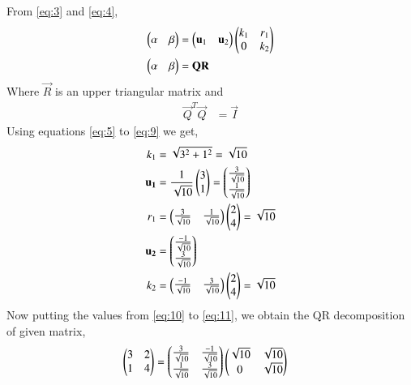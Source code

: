 \documentclass[journal,12pt,twocolumn]{IEEEtran}
\begin{document}
From \eqref{eq:3} and \eqref{eq:4}, 
\begin{align}
\begin{pmatrix}\alpha & \beta \end{pmatrix} &= \begin{pmatrix}\mathbf{u}_1 & \mathbf{u}_2\end{pmatrix}\begin{pmatrix}k_1 & r_1 \\ 0 & k_2\end{pmatrix} \\
\begin{pmatrix}\alpha & \beta \end{pmatrix} &= \mathbf{Q}\mathbf{R}
\end{align}
Where $\vec{R}$ is an upper triangular matrix and
\begin{align}
\vec{Q}^T\vec{Q}&=\vec{I}
\end{align}
Using equations \eqref{eq:5} to \eqref{eq:9} we get, 
\begin{align}
    k_1 &= \sqrt{3^2+1^2}=\sqrt{10} \label{eq:10}\\
    \mathbf{u_1} &= \frac{1}{\sqrt{10}}\begin{pmatrix}3\\1\end{pmatrix}= \begin{pmatrix}\frac{3}{\sqrt{10}} \\ \frac{1}{\sqrt{10}}\end{pmatrix} \\
    r_1 &= \begin{pmatrix}\frac{3}{\sqrt{10}} & \frac{1}{\sqrt{10}}\end{pmatrix}\begin{pmatrix}2\\4\end{pmatrix}=\sqrt{10} \\
    \mathbf{u_2} &= \begin{pmatrix}\frac{-1}{\sqrt{10}} \\ \frac{3}{\sqrt{10}}\end{pmatrix} \\
    k_2 &= \begin{pmatrix}\frac{-1}{\sqrt{10}} & \frac{3}{\sqrt{10}}\end{pmatrix}\begin{pmatrix}2\\4\end{pmatrix} = \sqrt{10} \label{eq:11}
\end{align}
Now putting the values from \eqref{eq:10} to \eqref{eq:11}, we obtain the QR decomposition of given matrix, 
\begin{align}
    \begin{pmatrix}3&2\\1&4\end{pmatrix} &= \begin{pmatrix}\frac{3}{\sqrt{10}}&\frac{-1}{\sqrt{10}}\\\frac{1}{\sqrt{10}}&\frac{3}{\sqrt{10}}\end{pmatrix}\begin{pmatrix}\sqrt{10}&\sqrt{10}\\0&\sqrt{10}\end{pmatrix}
\end{align}
\end{document}
